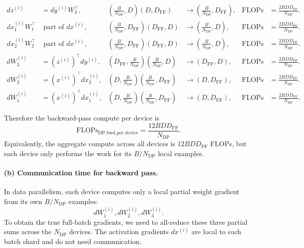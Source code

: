 \documentclass[11pt]{article}
\begin{document}
\begin{align*}
  dz^{(i)}
    &= dy^{(i)} W_3^\top,
  &
  \left(\frac{B}{N_{\text{DP}}}, D\right)(D,D_{\text{FF}})
    &\to \left(\frac{B}{N_{\text{DP}}}, D_{\text{FF}}\right),
  &
  \text{FLOPs}
    &= \frac{2BD D_{\text{FF}}}{N_{\text{DP}}}.
\\
  dx_1^{(i)} W_1^\top
    &\text{ part of } dx^{(i)},
  &
  \left(\frac{B}{N_{\text{DP}}}, D_{\text{FF}}\right)(D_{\text{FF}},D)
    &\to \left(\frac{B}{N_{\text{DP}}}, D\right),
  &
  \text{FLOPs}
    &= \frac{2BD D_{\text{FF}}}{N_{\text{DP}}}.
\\
  dx_2^{(i)} W_2^\top
    &\text{ part of } dx^{(i)},
  &
  \left(\frac{B}{N_{\text{DP}}}, D_{\text{FF}}\right)(D_{\text{FF}},D)
    &\to \left(\frac{B}{N_{\text{DP}}}, D\right),
  &
  \text{FLOPs}
    &= \frac{2BD D_{\text{FF}}}{N_{\text{DP}}}.
\\
  dW_3^{(i)}
    &= (z^{(i)})^\top dy^{(i)},
  &
  \left(D_{\text{FF}},\frac{B}{N_{\text{DP}}}\right)
  \left(\frac{B}{N_{\text{DP}}},D\right)
    &\to (D_{\text{FF}},D),
  &
  \text{FLOPs}
    &= \frac{2BD D_{\text{FF}}}{N_{\text{DP}}}.
\\
  dW_2^{(i)}
    &= (x^{(i)})^\top dx_2^{(i)},
  &
  \left(D,\frac{B}{N_{\text{DP}}}\right)
  \left(\frac{B}{N_{\text{DP}}},D_{\text{FF}}\right)
    &\to (D,D_{\text{FF}}),
  &
  \text{FLOPs}
    &= \frac{2BD D_{\text{FF}}}{N_{\text{DP}}}.
\\
  dW_1^{(i)}
    &= (x^{(i)})^\top dx_1^{(i)},
  &
  \left(D,\frac{B}{N_{\text{DP}}}\right)
  \left(\frac{B}{N_{\text{DP}}},D_{\text{FF}}\right)
    &\to (D,D_{\text{FF}}),
  &
  \text{FLOPs}
    &= \frac{2BD D_{\text{FF}}}{N_{\text{DP}}}.
\end{align*}

Therefore the backward-pass compute per device is
\[
  \boxed{
    \text{FLOPs}_{\text{DP,bwd,per device}}
    =
    \frac{12 B D D_{\text{FF}}}{N_{\text{DP}}}
  }.
\]
Equivalently, the aggregate compute across all devices is
$12BD D_{\text{FF}}$ FLOPs, but each device only performs the work for its
$B/N_{\text{DP}}$ local examples.


\paragraph{(b) Communication time for backward pass.}

In data parallelism, each device computes only a local partial weight gradient
from its own $B/N_{\text{DP}}$ examples:
\[
  dW_1^{(i)}, dW_2^{(i)}, dW_3^{(i)}.
\]
To obtain the true full-batch gradients, we need to all-reduce these three
partial sums across the $N_{\text{DP}}$ devices.  The activation gradients
$dx^{(i)}$ are local to each batch shard and do not need communication.
\end{document}
